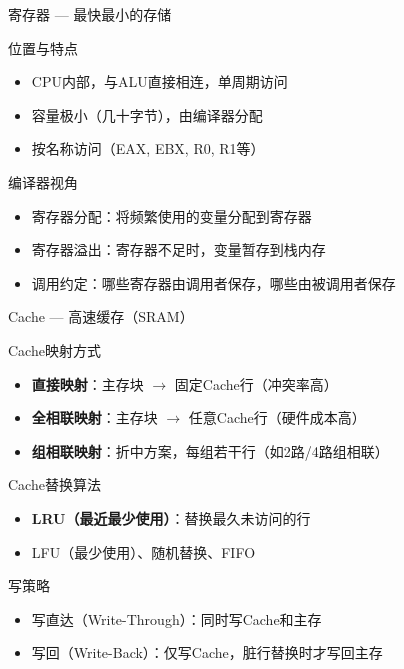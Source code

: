 \documentclass[10pt, aspectratio=169]{beamer}
\begin{document}
\begin{frame}{寄存器 --- 最快最小的存储}
    \begin{block}{位置与特点}
        \begin{itemize}
            \item CPU内部，与ALU直接相连，单周期访问
            \item 容量极小（几十字节），由编译器分配
            \item 按名称访问（EAX, EBX, R0, R1等）
        \end{itemize}
    \end{block}
    \begin{block}{编译器视角}
        \begin{itemize}
            \item 寄存器分配：将频繁使用的变量分配到寄存器
            \item 寄存器溢出：寄存器不足时，变量暂存到栈内存
            \item 调用约定：哪些寄存器由调用者保存，哪些由被调用者保存
        \end{itemize}
    \end{block}
\end{frame}

\begin{frame}{Cache --- 高速缓存（SRAM）}
    \begin{block}{Cache映射方式}
        \begin{itemize}
            \item \textbf{直接映射}：主存块 $\to$ 固定Cache行（冲突率高）
            \item \textbf{全相联映射}：主存块 $\to$ 任意Cache行（硬件成本高）
            \item \textbf{组相联映射}：折中方案，每组若干行（如2路/4路组相联）
        \end{itemize}
    \end{block}
    \begin{block}{Cache替换算法}
        \begin{itemize}
            \item \textbf{LRU（最近最少使用）}：替换最久未访问的行
            \item LFU（最少使用）、随机替换、FIFO
        \end{itemize}
    \end{block}
    \begin{block}{写策略}
        \begin{itemize}
            \item 写直达（Write-Through）：同时写Cache和主存
            \item 写回（Write-Back）：仅写Cache，脏行替换时才写回主存
        \end{itemize}
    \end{block}
\end{frame}
\end{document}
